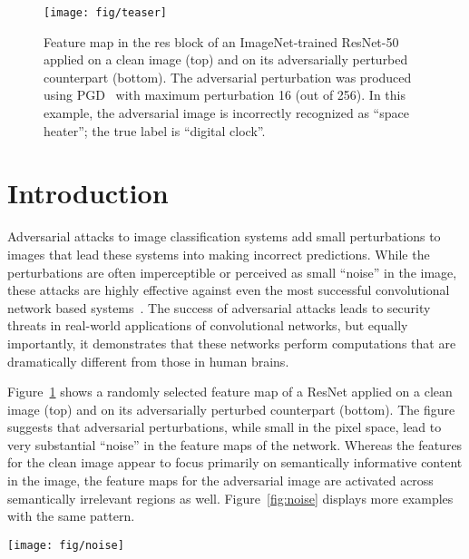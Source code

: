 \documentclass[10pt,twocolumn,letterpaper]{article}
\begin{document}
\begin{figure}[t]
\centering
\texttt{[image: fig/teaser]}
\vspace{-.2em}
\caption{Feature map in the res block of an ImageNet-trained ResNet-50 \cite{He2016} applied on a clean image (top) and on its adversarially perturbed counterpart (bottom). The adversarial  perturbation was produced using PGD~\cite{Madry2018} with maximum perturbation  16 (out of 256). In this example, the adversarial image is incorrectly recognized as ``space heater''; the true label is ``digital clock''.}
\label{fig:teaser}
\vspace{-1.2em}
\end{figure}


\vspace{-0.5em}
\section{Introduction}

Adversarial attacks to image classification systems \cite{Szegedy2014} add small perturbations to images that lead these systems into making incorrect predictions. While the perturbations are often imperceptible or perceived as small ``noise'' in the image, these attacks are highly effective against even the most successful convolutional network based systems~\cite{Krizhevsky2012,LeCun1989}. The success of adversarial attacks leads to security threats in real-world applications of convolutional networks, but equally importantly, it demonstrates that these networks perform computations that are dramatically different from those in human brains.

Figure~\ref{fig:teaser} shows a randomly selected feature map of a ResNet \cite{He2016} applied on a clean image (top) and on its adversarially perturbed counterpart (bottom). The figure suggests that adversarial perturbations, while small in the pixel space, lead to very substantial ``noise'' in the feature maps of the network. Whereas the features for the clean image appear to focus primarily on semantically informative content in the image, the feature maps for the adversarial image are activated across semantically irrelevant regions as well. Figure~\ref{fig:noise} displays more examples with the same pattern.

\begin{figure*}[t]
\centering
\vspace{-.5em}
\texttt{[image: fig/noise]}
\vspace{-1em}
\caption{More examples similar to Figure~\ref{fig:teaser}. We show feature maps corresponding to clean images (top) and to their adversarial perturbed versions (bottom). The feature maps for each pair of examples are from the same channel of a res block in the same ResNet-50 trained on clean images. The attacker has a maximum perturbation  in the pixel domain.}
\label{fig:noise}
\vspace{-1.5em}
\end{figure*}
\end{document}
